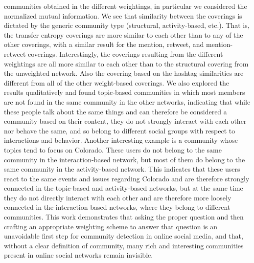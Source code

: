 \documentclass[10pt,a4paper]{article}
\begin{document}
communities obtained in the different weightings, in particular we considered the normalized mutual information. We see that similarity between the coverings is dictated by the generic community type (structural, activity-based, etc.). That is, the transfer entropy coverings are more similar to each other than to any of the other coverings, with a similar result for the mention, retweet, and mention-retweet coverings. Interestingly, the coverings resulting from the different weightings are all more similar to each other than to the structural covering from the unweighted network. Also the covering based on the hashtag similarities are different from all of the other weight-based coverings. We also explored the results qualitatively and found topic-based communities in which most members are not found in the same community in the other networks, indicating that while these people talk about the same things and can therefore be considered a community based on their content, they do not strongly interact with each other nor behave the same, and so belong to different social groups with respect to interactions and behavior. Another interesting example is a community whose topics tend to focus on Colorado. These users do not belong to the same community in the interaction-based network, but most of them do belong to the same community in the activity-based network. This indicates that these users react to the same events and issues regarding Colorado and are therefore strongly connected in the topic-based and activity-based networks, but at the same time they do not directly interact with each other and are therefore more loosely connected in the interaction-based networks, where they belong to different communities. This work demonstrates that asking the proper question and then crafting an appropriate weighting scheme to answer that question is an unavoidable first step for community detection in online social media, and that, without a clear definition of community, many rich and interesting communities present in online social networks remain invisible.

\footnotesize

\end{document}
